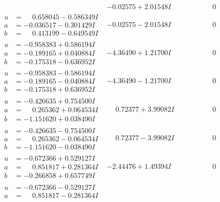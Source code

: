 \documentclass[1p]{elsarticle_modified}
\theoremstyle{definition}
\begin{document}
$$\begin{array}{c|c|c}
 & -0.02575 + 2.01548 I & \phantom{-0.000000 } 0 \\ \hline\begin{aligned}
u &= \phantom{-}0.658045 - 0.586349 I \\
a &= -0.036517 - 0.301429 I \\
b &= \phantom{-}0.413199 - 0.649549 I\end{aligned}
 & -0.02575 - 2.01548 I & \phantom{-0.000000 } 0 \\ \hline\begin{aligned}
u &= -0.958383 + 0.586194 I \\
a &= -0.189165 + 0.040884 I \\
b &= -0.175318 - 0.636952 I\end{aligned}
 & -4.36490 + 1.21700 I & \phantom{-0.000000 } 0 \\ \hline\begin{aligned}
u &= -0.958383 - 0.586194 I \\
a &= -0.189165 - 0.040884 I \\
b &= -0.175318 + 0.636952 I\end{aligned}
 & -4.36490 - 1.21700 I & \phantom{-0.000000 } 0 \\ \hline\begin{aligned}
u &= -0.426635 + 0.754500 I \\
a &= \phantom{-}0.265362 + 0.064534 I \\
b &= -1.151620 + 0.038490 I\end{aligned}
 & \phantom{-}0.72377 + 3.99082 I & \phantom{-0.000000 } 0 \\ \hline\begin{aligned}
u &= -0.426635 - 0.754500 I \\
a &= \phantom{-}0.265362 - 0.064534 I \\
b &= -1.151620 - 0.038490 I\end{aligned}
 & \phantom{-}0.72377 - 3.99082 I & \phantom{-0.000000 } 0 \\ \hline\begin{aligned}
u &= -0.672366 + 0.529127 I \\
a &= \phantom{-}0.851817 + 0.281364 I \\
b &= -0.266858 + 0.657749 I\end{aligned}
 & -2.44476 + 1.49394 I & \phantom{-0.000000 } 0 \\ \hline\begin{aligned}
u &= -0.672366 - 0.529127 I \\
a &= \phantom{-}0.851817 - 0.281364 I \\

\end{aligned}
\end{array}$$
\end{document}
